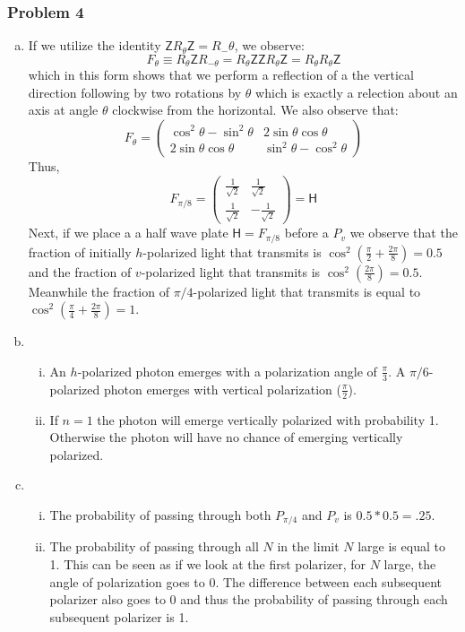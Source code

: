 \documentclass[a4paper,11pt]{article}
\begin{document}
\subsubsection*{Problem 4}
\begin{enumerate}[a)]
    \item If we utilize the identity $\mathsf{Z}R_\theta\mathsf{Z}=R_-\theta$, we observe: 
        $$F_\theta\equiv R_\theta\mathsf{Z}R_{-\theta}=R_\theta\mathsf{Z}\mathsf{Z}R_\theta\mathsf{Z}=R_\theta R_\theta\mathsf{Z}$$
        which in this form shows that we perform a reflection of a the vertical direction following by two rotations by $\theta$ which is exactly a relection about an axis at angle $\theta$ clockwise from the horizontal. We also observe that:
        $$F_\theta=\left( \begin{array}{cc} \cos^2\theta-\sin^2\theta & 2\sin\theta\cos\theta \\ 2\sin\theta\cos\theta & \sin^2\theta-\cos^2\theta \end{array} \right)$$
        Thus, $$F_{\pi/8}=\left( \begin{array}{cc} \frac{1}{\sqrt{2}} &  \frac{1}{\sqrt{2}}\\  \frac{1}{\sqrt{2}}& -\frac{1}{\sqrt{2}}\end{array} \right)=\mathsf{H}$$
        Next, if we place a a half wave plate $\mathsf{H}=F_{\pi/8}$ before a $P_v$ we observe that the fraction of initially $h$-polarized light that transmits is $\cos^2(\frac{\pi}{2}+\frac{2\pi}{8})=0.5$ and the fraction of $v$-polarized light that transmits is $\cos^2(\frac{2\pi}{8})=0.5$. Meanwhile the fraction of $\pi/4$-polarized light that transmits is equal to $\cos^2(\frac{\pi}{4}+\frac{2\pi}{8})=1$.
    \item \begin{enumerate}[(i)]
            \item An $h$-polarized photon emerges with a polarization angle of $\frac{\pi}{3}$. A $\pi/6$-polarized photon emerges with vertical polarization ($\frac{\pi}{2}$).
            \item If $n=1$ the photon will emerge vertically polarized with probability 1. Otherwise the photon will have no chance of emerging vertically polarized.
        \end{enumerate}
    \item \begin{enumerate}[(i)]
            \item The probability of passing through both $P_{\pi/4}$ and $P_v$ is $0.5*0.5=.25$.
            \item The probability of passing through all $N$ in the limit $N$ large is equal to 1. This can be seen as if we look at the first polarizer, for $N$ large, the angle of polarization goes to 0. The difference between each subsequent polarizer also goes to 0 and thus the probability of passing through each subsequent polarizer is 1.
\end{enumerate}
\end{enumerate}
\end{document}
